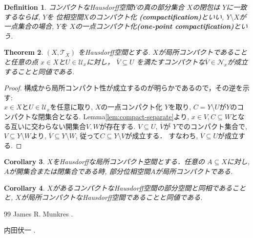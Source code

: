 \documentclass[dvipdfmx]{jbook}
\newcommand{\cl}[1]{\overline{ #1}  }
\newtheorem{theorem}{Theorem}[section]
\newtheorem{corollary}[theorem]{Corollary}
\newtheorem{definition}[theorem]{Definition}
\theoremstyle{remark}
\theoremstyle{plain}
\begin{document}
\begin{definition}
	コンパクトなHausdorff空間$Y$の真の部分集合 $X$の閉包は $Y$に一致するならば, 
	$Y$を 位相空間$X$のコンパクト化 \textbf{(compactification)}といい, 
	$Y \setminus X$が一点集合の場合,
	$Y$を $X$の一点コンパクト化\textbf{(one-point compactification)}という.
\end{definition}



\begin{theorem}
	$\left( X , \mathcal{T}_{X} \right)$ をHausdorff空間とする. 
	$X$が局所コンパクトであることと任意の点 $x \in X$と$U \in \mathcal{U}_x$に対し，
	$\overline{V} \subseteq U$ を満たすコンパクトな$\overline{V} \in  \mathcal{N}_x$が成立することと同値である.
\end{theorem}

\begin{proof}
	構成から局所コンパクト性が成立するのが明らかであるので，その逆を示す:\\
	$x \in X$と$U \in \mathcal{U}_x$を任意に取り, $X$の一点コンパクト化 $Y$を取り, 
	$C = Y \setminus U$が$Y$のコンパクトな閉集合となる. 
	Lemma\ref{lem:compact-separate}より,
	$x \in V, C \subseteq W $となる互いに交わらない開集合$V ,W$が存在する. 
	$V \subseteq U$, $\cl{V}$が $Y$でのコンパクト集合で, 
	$V \subseteq Y \setminus W$より, 
	$\cl{V} \subseteq Y \setminus W$,
	従って$C \subseteq Y \setminus V$が成立する． 
	すなわち, $\cl{V} \subseteq U$が成立する.
\end{proof}

\begin{corollary}
	$X$をHausdorffな局所コンパクト空間とする．任意の $A \subseteq X$に対し, $A$が開集合または閉集合である時, 部分位相空間$A$が局所コンパクトである.
\end{corollary}

\begin{corollary}
	$X$があるコンパクトなHausdorff空間の部分空間と同相であることと,  $X$が局所コンパクトなHausdorff空間であることと同値である.
\end{corollary}








\begin{thebibliography}{99}
	 James R. Munkres 
	.

	 内田伏一 
	.
\end{thebibliography}
\end{document}
